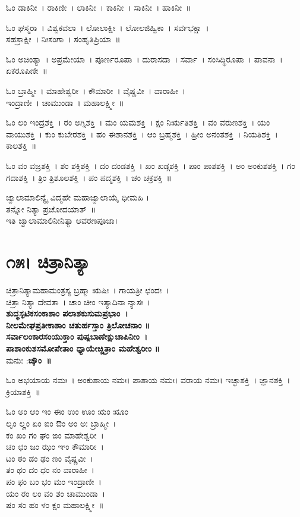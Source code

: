 ಓಂ ಡಾಕಿನೀ~। ರಾಕಿಣೀ~। ಲಾಕಿನೀ~। ಕಾಕಿನೀ~। ಸಾಕಿನೀ~। ಹಾಕಿನೀ~॥ 

ಓಂ ಘಸ್ಮರಾ~। ವಿಶ್ವಕವಲಾ~। ಲೋಲಾಕ್ಷೀ~। ಲೋಲಜಿಹ್ವಿಕಾ~। ಸರ್ವಭಕ್ಷಾ~। \\ ಸಹಸ್ರಾಕ್ಷೀ~। ನಿಃಸಂಗಾ~। ಸಂಹೃತಿಪ್ರಿಯಾ~॥ 

ಓಂ ಅಚಿಂತ್ಯಾ~। ಅಪ್ರಮೇಯಾ~। ಪೂರ್ಣರೂಪಾ~। ದುರಾಸದಾ~। ಸರ್ವಾ~। ಸಂಸಿದ್ಧಿರೂಪಾ~। ಪಾವನಾ~। ಏಕರೂಪಿಣೀ~॥ 

ಓಂ ಬ್ರಾಹ್ಮೀ~। ಮಾಹೇಶ್ವರೀ~। ಕೌಮಾರೀ~। ವೈಷ್ಣವೀ~। ವಾರಾಹೀ~।\\ ಇಂದ್ರಾಣೀ~। ಚಾಮುಂಡಾ~। ಮಹಾಲಕ್ಷ್ಮೀ~॥ 

ಓಂ ಲಂ ಇಂದ್ರಶಕ್ತಿ~। ರಂ ಅಗ್ನಿಶಕ್ತಿ~। ಮಂ ಯಮಶಕ್ತಿ~। ಕ್ಷಂ ನಿರ್ಋತಿಶಕ್ತಿ~। ವಂ ವರುಣಶಕ್ತಿ~। ಯಂ ವಾಯುಶಕ್ತಿ~। ಕುಂ ಕುಬೇರಶಕ್ತಿ~। ಹಂ ಈಶಾನಶಕ್ತಿ~। ಆಂ ಬ್ರಹ್ಮಶಕ್ತಿ~। ಹ್ರೀಂ ಅನಂತಶಕ್ತಿ~। ನಿಯತಿಶಕ್ತಿ~। ಕಾಲಶಕ್ತಿ~॥

ಓಂ ವಂ ವಜ್ರಶಕ್ತಿ~। ಶಂ ಶಕ್ತಿಶಕ್ತಿ~। ದಂ ದಂಡಶಕ್ತಿ~। ಖಂ ಖಡ್ಗಶಕ್ತಿ~। ಪಾಂ ಪಾಶಶಕ್ತಿ~। ಅಂ ಅಂಕುಶಶಕ್ತಿ~। ಗಂ ಗದಾಶಕ್ತಿ~। ತ್ರಿಂ ತ್ರಿಶೂಲಶಕ್ತಿ~। ಪಂ ಪದ್ಮಶಕ್ತಿ~। ಚಂ ಚಕ್ರಶಕ್ತಿ~॥

ಜ್ವಾಲಾಮಾಲಿನ್ಯೈ ವಿದ್ಮಹೇ ಮಹಾಜ್ವಾಲಾಯೈ ಧೀಮಹಿ ।\\ತನ್ನೋ ನಿತ್ಯಾ ಪ್ರಚೋದಯಾತ್~॥\\
ಇತಿ ಜ್ವಾಲಾಮಾಲಿನೀನಿತ್ಯಾ ಆವರಣಪೂಜಾ।
\section{೧೫। ಚಿತ್ರಾನಿತ್ಯಾ}
ಚಿತ್ರಾನಿತ್ಯಾಮಹಾಮಂತ್ರಸ್ಯ ಬ್ರಹ್ಮಾ ಋಷಿಃ~। ಗಾಯತ್ರೀ ಛಂದಃ~। \\ಚಿತ್ರಾ ನಿತ್ಯಾ ದೇವತಾ~। ಚಾಂ ಚೀಂ ಇತ್ಯಾದಿನಾ ನ್ಯಾಸಃ~।\\
{\bfseries ಶುದ್ಧಸ್ಫಟಿಕಸಂಕಾಶಾಂ ಪಲಾಶಕುಸುಮಪ್ರಭಾಂ~।\\
ನೀಲಮೇಘಪ್ರತೀಕಾಶಾಂ ಚತುರ್ಹಸ್ತಾಂ ತ್ರಿಲೋಚನಾಂ ॥\\
ಸರ್ವಾಲಂಕಾರಸಂಯುಕ್ತಾಂ ಪುಷ್ಪಬಾಣೇಕ್ಷುಚಾಪಿನೀಂ~।\\
ಪಾಶಾಂಕುಶಸಮೋಪೇತಾಂ ಧ್ಯಾಯೇಚ್ಚಿತ್ರಾಂ ಮಹೇಶ್ವರೀಂ ॥\\}
ಮನುಃ :{\bfseries ಚ್ಕೌಂ~॥}

ಓಂ ಅಭಯಾಯ ನಮಃ~। ಅಂಕುಶಾಯ ನಮಃ। ಪಾಶಾಯ ನಮಃ। ವರಾಯ ನಮಃ। ಇಚ್ಛಾಶಕ್ತಿ~। ಜ್ಞಾನಶಕ್ತಿ~। ಕ್ರಿಯಾಶಕ್ತಿ~॥ 

ಓಂ ಅಂ ಆಂ ಇಂ ಈಂ ಉಂ ಊಂ ಋಂ ೠಂ \\ಲೃಂ ಲೄಂ ಏಂ ಐಂ ಔಂ ಅಂ ಅಃ ಬ್ರಾಹ್ಮೀ~।\\ ಕಂ ಖಂ ಗಂ ಘಂ ಙಂ ಮಾಹೇಶ್ವರೀ~।\\ ಚಂ ಛಂ ಜಂ ಝಂ ಞಂ ಕೌಮಾರೀ~।\\ ಟಂ ಠಂ ಡಂ ಢಂ ಣಂ ವೈಷ್ಣವೀ~। \\ತಂ ಥಂ ದಂ ಧಂ ನಂ ವಾರಾಹೀ~। \\ಪಂ ಫಂ ಬಂ ಭಂ ಮಂ ಇಂದ್ರಾಣೀ~। \\ ಯಂ ರಂ ಲಂ ವಂ ಶಂ ಚಾಮುಂಡಾ~। \\ ಷಂ ಸಂ ಹಂ ಳಂ ಕ್ಷಂ ಮಹಾಲಕ್ಷ್ಮೀ~॥ 

